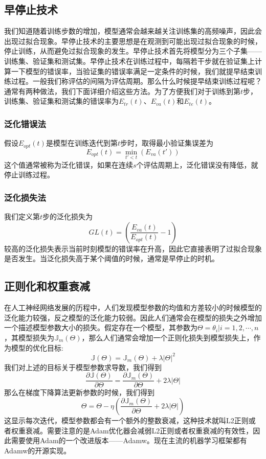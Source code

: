 \documentclass[twoside,a4paper,12pt]{book}%
\begin{document}
\subsection{早停止技术}
我们知道随着训练步数的增加，模型通常会越来越关注训练集的高频噪声，因此会出现过拟合现象。早停止技术的主要思想是在观测到可能出现过拟合现象的时候，停止训练，从而避免过拟合现象的发生。早停止技术首先将模型分为三个子集——训练集、验证集和测试集。早停止技术在训练过程中，每隔若干步就在验证集上计算一下模型的错误率，当验证集的错误率满足一定条件的时候，我们就提早结束训练过程。一般我们称评估的间隔为评估周期。那么什么时候提早结束训练过程呢？通常有两种做法，我们下面详细介绍这些方法。为了方便我们对于训练到第$t$步，训练集、验证集和测试集的错误率为$E_{tr}(t)$、$E_{va}(t)$和$E_{te}(t)$。
\subsubsection{泛化错误法}
假设$E_{opt}(t)$是模型在训练迭代到第$t$步时，取得最小验证集误差为
$$
E_{opt}(t) = \min_{t'<t}(E_{va}(t'))
$$
这个值通常被称为泛化错误，如果在连续$s$个评估周期上，泛化错误没有降低，就停止训练过程。
\subsubsection{泛化损失法}
我们定义第$t$步的泛化损失为
$$
GL(t)=(\frac{E_{va}(t)}{E_{opt}(t)}-1)
$$
较高的泛化损失表示当前时刻模型的错误率在升高，因此它直接表明了过拟合现象是否发生。当泛化损失高于某个阈值的时候，通常是早停止的时机。


\subsection{正则化和权重衰减}

在人工神经网络发展的历程中，人们发现模型参数的均值和方差较小的时候模型的泛化能力较强，反之模型的泛化能力较弱。因此人们通常会在模型的损失之外增加一个描述模型参数大小的损失。假定存在一个模型，其参数为$\Theta={\theta_i | i=1,2,\cdots,n}$，其模型损失为$\mathbb{J}_m(\Theta)$，那么人们通常会增加一个正则化损失到模型损失上，作为模型的优化目标:
$$
\mathbb{J}(\Theta)=\mathbb{J}_m(\Theta) + \lambda |\Theta|^2
$$
我们对上述的目标关于模型参数求导数，我们得到
$$
\frac{\partial{\mathbb{J}(\Theta)}}{\partial{\Theta}} = \frac{\partial{\mathbb{J}_m(\Theta)}}{\partial{\Theta}} + 2\lambda |\Theta|
$$
那么在梯度下降算法更新参数的时候，我们得到
$$
\Theta = \Theta - \eta( \frac{\partial{\mathbb{J}_m(\Theta)}}{\partial{\Theta}} + 2\lambda |\Theta|)
$$
这显示每次迭代，模型参数都会有一个额外的整数衰减，这种技术就叫L2正则或者权重衰减。需要注意的是Adam优化器会减弱L2正则或者权重衰减的有效性，因此需要使用Adam的一个改进版本——Adamw。现在主流的机器学习框架都有Adamw的开源实现。
\end{document}
